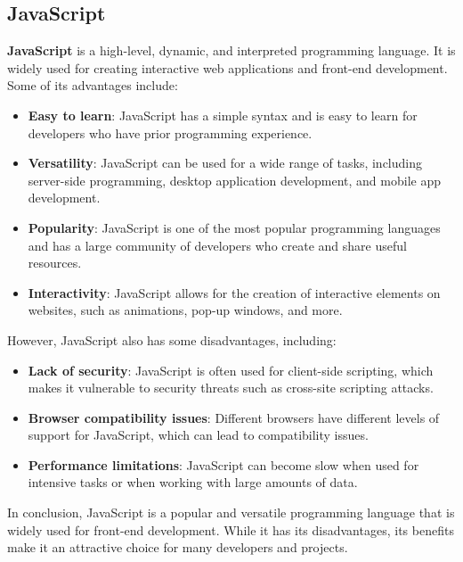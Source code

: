 \subsection{JavaScript}
\textbf{JavaScript} is a high-level, dynamic, and interpreted programming language. It is widely used for creating interactive web applications and front-end development. Some of its advantages include:
\begin{itemize}
    \item \textbf{Easy to learn}: JavaScript has a simple syntax and is easy to learn for developers who have prior programming experience.
    \item \textbf{Versatility}: JavaScript can be used for a wide range of tasks, including server-side programming, desktop application development, and mobile app development.
    \item \textbf{Popularity}: JavaScript is one of the most popular programming languages and has a large community of developers who create and share useful resources.
    \item \textbf{Interactivity}: JavaScript allows for the creation of interactive elements on websites, such as animations, pop-up windows, and more.
\end{itemize}
However, JavaScript also has some disadvantages, including:
\begin{itemize}
    \item \textbf{Lack of security}: JavaScript is often used for client-side scripting, which makes it vulnerable to security threats such as cross-site scripting attacks.
    \item \textbf{Browser compatibility issues}: Different browsers have different levels of support for JavaScript, which can lead to compatibility issues.
    \item \textbf{Performance limitations}: JavaScript can become slow when used for intensive tasks or when working with large amounts of data.
\end{itemize}
In conclusion, JavaScript is a popular and versatile programming language that is widely used for front-end development. While it has its disadvantages, its benefits make it an attractive choice for many developers and projects.
